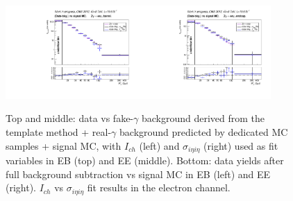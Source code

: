 \begin{figure}[htb]
\begin{center}
\includegraphics[width=0.45\textwidth]{../figs/figs_v11/ELECTRON_ZGamma/PrepareYields/c_BkgSubtrDATAvsSIGMC_c_ELECTRON_ZGamma__UNblind__Barrel__phoEt.pdf}\includegraphics[width=0.45\textwidth]{../figs/figs_v11/ELECTRON_ZGamma/PrepareYields/c_BkgSubtrDATAvsSIGMC_c_ELECTRON_ZGamma__UNblind__Endcap__phoEt.pdf}\\
  \caption{Top and middle: data vs fake-$\gamma$ background derived from the template method + real-$\gamma$ background predicted by dedicated MC samples + signal MC, with $I_{ch}$ (left) and $\sigma_{i\eta i\eta}$ (right) used as fit variables in EB (top) and EE (middle). Bottom: data yields after full background subtraction vs signal MC in EB (left) and EE (right). $I_{ch}$ vs $\sigma_{i\eta i\eta}$ fit results in the electron channel.}
  \label{fig:DDvsMC_Zg_Data_ELECTRON}
  \end{center}
\end{figure}

